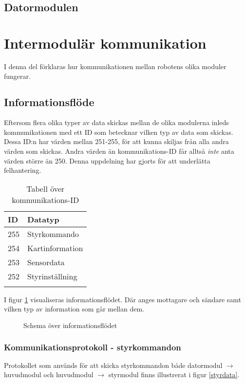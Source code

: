 \documentclass[11pt]{article}
\begin{document}
\begin{flushleft}
\subsection{Datormodulen}

\pagebreak
\section{Intermodulär kommunikation}
I denna del förklaras hur kommunikationen mellan robotens olika moduler fungerar.

\subsection{Informationsflöde}
Eftersom flera olika typer av data skickas mellan de olika modulerna inleds kommunikationen med ett ID som betecknar vilken typ av data som skickas. Dessa ID:n har värden mellan 251-255, för att kunna skiljas från alla andra värden som skickas. Andra värden än kommunikations-ID får alltså \emph{inte} anta värden större än 250. Denna uppdelning har gjorts för att underlätta felhantering.

\begin{longtable}[l]{| l | l |} \hline
\textbf{ID} & \textbf{Datatyp} \\ \hline 
255 & Styrkommando \\ \hline
254 & Kartinformation \\ \hline
253 & Sensordata \\ \hline
252 & Styrinställning \\ \hline

\caption{Tabell över kommunikations-ID}\label{kommunikationstab}
\end{longtable}

I figur \ref{informationFlow} visualiseras informationsflödet. Där anges mottagare och sändare samt vilken typ av information som går mellan dem.

\begin{figure}[htbp]
\centering
\noindent\resizebox{1\linewidth}{!}{
	}
	\caption{Schema över informationsflödet\label{informationFlow}}	
\end{figure}

\subsubsection{Kommunikationsprotokoll - styrkommandon}
Protokollet som används för att skicka styrkommandon både datormodul $\rightarrow$ huvudmodul och huvudmodul $\rightarrow$ styrmodul finns illustrerat i figur \ref{styrdata}.


\end{flushleft}
\end{document}
